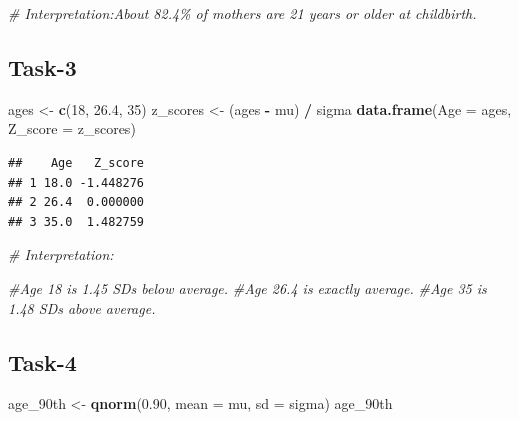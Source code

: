 \documentclass[
]{article}
\newenvironment{Shaded}{\begin{snugshade}}{\end{snugshade}}
\newcommand{\AttributeTok}[1]{\textcolor[rgb]{0.13,0.29,0.53}{#1}}
\newcommand{\CommentTok}[1]{\textcolor[rgb]{0.56,0.35,0.01}{\textit{#1}}}
\newcommand{\DecValTok}[1]{\textcolor[rgb]{0.00,0.00,0.81}{#1}}
\newcommand{\FloatTok}[1]{\textcolor[rgb]{0.00,0.00,0.81}{#1}}
\newcommand{\FunctionTok}[1]{\textcolor[rgb]{0.13,0.29,0.53}{\textbf{#1}}}
\newcommand{\NormalTok}[1]{#1}
\newcommand{\OtherTok}[1]{\textcolor[rgb]{0.56,0.35,0.01}{#1}}
\newcommand{\SpecialCharTok}[1]{\textcolor[rgb]{0.81,0.36,0.00}{\textbf{#1}}}
\begin{document}
\begin{Shaded}
\begin{Highlighting}[]
\CommentTok{\# Interpretation:About 82.4\% of mothers are 21 years or older at childbirth.}
\end{Highlighting}
\end{Shaded}

\subsection{Task-3}\label{task-3}

\begin{Shaded}
\begin{Highlighting}[]
\NormalTok{ages }\OtherTok{\textless{}{-}} \FunctionTok{c}\NormalTok{(}\DecValTok{18}\NormalTok{, }\FloatTok{26.4}\NormalTok{, }\DecValTok{35}\NormalTok{)}
\NormalTok{z\_scores }\OtherTok{\textless{}{-}}\NormalTok{ (ages }\SpecialCharTok{{-}}\NormalTok{ mu) }\SpecialCharTok{/}\NormalTok{ sigma}
\FunctionTok{data.frame}\NormalTok{(}\AttributeTok{Age =}\NormalTok{ ages, }\AttributeTok{Z\_score =}\NormalTok{ z\_scores)}
\end{Highlighting}
\end{Shaded}

\begin{verbatim}
##    Age   Z_score
## 1 18.0 -1.448276
## 2 26.4  0.000000
## 3 35.0  1.482759
\end{verbatim}

\begin{Shaded}
\begin{Highlighting}[]
\CommentTok{\# Interpretation: }

\CommentTok{\#Age 18 is 1.45 SDs below average.}
\CommentTok{\#Age 26.4 is exactly average.}
\CommentTok{\#Age 35 is 1.48 SDs above average.}
\end{Highlighting}
\end{Shaded}

\subsection{Task-4}\label{task-4}

\begin{Shaded}
\begin{Highlighting}[]
\NormalTok{age\_90th }\OtherTok{\textless{}{-}} \FunctionTok{qnorm}\NormalTok{(}\FloatTok{0.90}\NormalTok{, }\AttributeTok{mean =}\NormalTok{ mu, }\AttributeTok{sd =}\NormalTok{ sigma)}
\NormalTok{age\_90th}
\end{Highlighting}
\end{Shaded}
\end{document}
